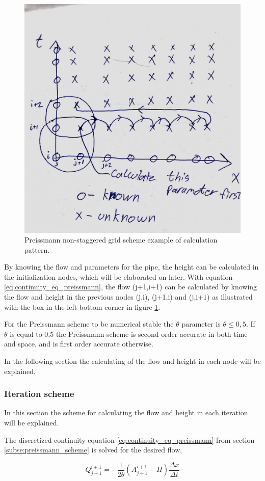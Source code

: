 \begin{figure}[H]
\centering
\includegraphics[width=.6\textwidth]{report/modeling/pictures/preissmann_scheme_exempel}
\caption{Preissmann non-staggered grid scheme example of calculation pattern.}
\label{fig:preissmann_grid_scheme_exampel}
\end{figure} 
By knowing the flow and parameters for the pipe, the height can be calculated in the initialization nodes, which will be elaborated on later. With equation \ref{eq:continuity_eq_preissmann}, the flow (j+1,i+1) can be calculated by knowing the flow and height in the previous nodes (j,i), (j+1,i) and (j,i+1) as illustrated with the box in the left bottom corner in figure \ref{fig:preissmann_grid_scheme_exampel}.  

For the Preissmann scheme to be numerical stable the $\theta$ parameter is $\theta \leq 0,5$. If $\theta$ is equal to 0,5 the Preissmann scheme is second order accurate in both time and space, and is first order accurate otherwise.   

In the following section the calculating of the flow and height in each node will be explained.

\subsubsection*{Iteration scheme}
In this section the scheme for calculating the flow and height in each iteration will be explained. 

The discretized continuity equation \ref{eq:continuity_eq_preissmann} from section \ref{subse:preissmann_scheme} is solved for the desired flow,

\begin{equation}\label{eq:continuity_solve_flow}
	Q_{j+1}^{i+1} = - \frac{1}{2\theta}\left(A_{j+1}^{i+1}-H\right)\frac{\Delta x}{\Delta t}
\end{equation}

